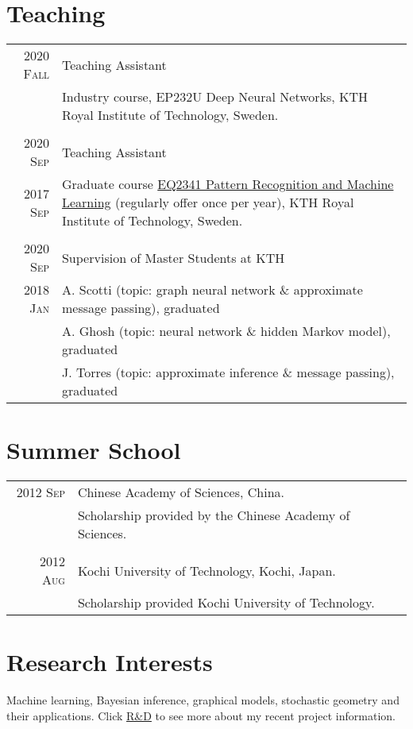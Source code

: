 \documentclass[a4paper,10pt]{article}
\begin{document}
\section{Teaching}
\begin{tabular}{r|p{13cm}}
  \textsc{2020 Fall}  & Teaching Assistant \\
                      & Industry course, {EP232U Deep Neural Networks}, KTH Royal Institute of Technology, Sweden.\\
  \multicolumn{2}{c}{} \\

  \textsc{2020 Sep}  & Teaching Assistant \\
  \textsc{2017 Sep}  & Graduate course \href{https://www.kth.se/student/kurser/kurs/EQ2341?l=en}{EQ2341 Pattern Recognition and Machine Learning} (regularly offer once per year), KTH Royal Institute of Technology, Sweden.\\
  \multicolumn{2}{c}{} \\

  \textsc{2020 Sep}  & Supervision of Master Students at KTH \\
  \textsc{2018 Jan}  & A. Scotti (topic: graph neural network \& approximate message passing), graduated \\
                      & A. Ghosh (topic: neural network \& hidden Markov model), graduated \\
                      & J. Torres (topic: approximate inference \& message passing), graduated
\end{tabular}

\section{Summer School}
\begin{tabular}{r|p{13cm}}

  \textsc{2012 Sep}  & Chinese Academy of Sciences, China. \\
                     & Scholarship provided by the Chinese Academy of Sciences. \\
  \multicolumn{2}{c}{}\\
  \textsc{2012 Aug}  & Kochi University of Technology, Kochi, Japan. \\
                     & Scholarship provided Kochi University of Technology.
\end{tabular}

\section{Research Interests}
Machine learning, Bayesian inference, graphical models, stochastic geometry and their applications. Click \href{https://firsthandscientist.github.io/#/research}{R\&D} to see more about my recent project information.
\end{document}
